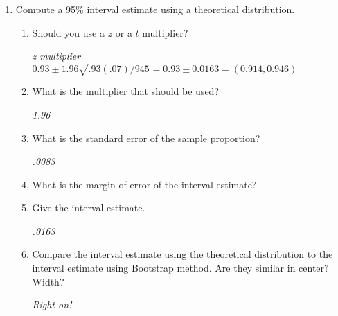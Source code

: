 \begin{enumerate}
\begin{enumerate}
       \item Compute a 95\% interval estimate using a theoretical
         distribution.
         \begin{enumerate}
           \item Should you use a $z$ or a $t$ multiplier? 
\begin{students}
          \vspace{.5cm}
\end{students}
\begin{key}
 {\it z multiplier  $0.93 \pm 1.96 \sqrt{.93(.07)/945} = 0.93 \pm 0.0163 = (0.914, 0.946)$ }      
\end{key}
           \item What is the multiplier that should be used? 
\begin{students}
          \vspace{.5cm}
\end{students}
\begin{key}
 {\it  1.96}      
\end{key}
           \item What is the standard error of the sample proportion?
\begin{students}
          \vspace{1cm}
\end{students}
\begin{key}
 {\it  .0083}      
\end{key}
           \item What is the margin of error of the interval estimate? \vspace{.5cm}
           \item Give the interval estimate.
\begin{students}
          \vspace{.5cm}
\end{students}
\begin{key}
 {\it  .0163}      
\end{key}          
           \item Compare the interval estimate using the theoretical
             distribution to the interval estimate using Bootstrap
             method.  Are they similar in center?  Width? 
\begin{students}
          \vspace*{2cm} \newpage
\end{students}
\begin{key}
 {\it  Right on!}      
\end{key}
           \end{enumerate}


\end{enumerate}
\end{enumerate}
